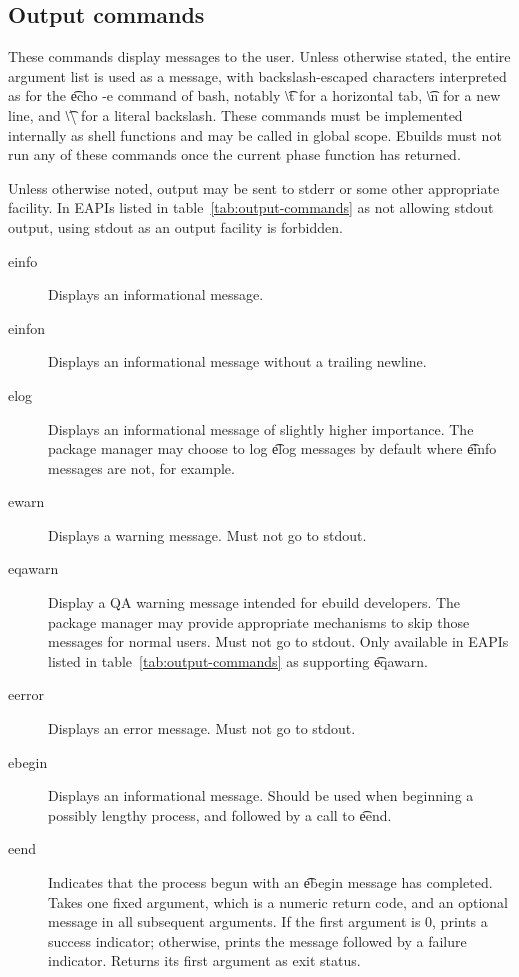 \subsection{Output commands}
These commands display messages to the user. Unless otherwise stated, the entire argument list is
used as a message, with backslash-escaped characters interpreted as for the \t{echo -e} command of
bash, notably \t{\textbackslash t} for a horizontal tab, \t{\textbackslash n} for a new line, and
\t{\textbackslash\textbackslash} for a literal backslash. These commands must be implemented
internally as shell functions and may be called in global scope. Ebuilds must not run any of these
commands once the current phase function has returned.

 Unless otherwise noted, output may be sent to stderr or some other
appropriate facility. In EAPIs listed in table~\ref{tab:output-commands} as not allowing stdout
output, using stdout as an output facility is forbidden.

\begin{description}
\item[einfo] Displays an informational message.
\item[einfon] Displays an informational message without a trailing newline.
\item[elog] Displays an informational message of slightly higher importance. The package
    manager may choose to log \t{elog} messages by default where \t{einfo} messages are not, for
    example.
\item[ewarn] Displays a warning message. Must not go to stdout.
\item[eqawarn]  Display a QA warning message intended for ebuild developers.
    The package manager may provide appropriate mechanisms to skip those messages for normal users.
    Must not go to stdout. Only available in EAPIs listed in table~\ref{tab:output-commands} as
    supporting \t{eqawarn}.
\item[eerror] Displays an error message. Must not go to stdout.
\item[ebegin] Displays an informational message. Should be used when beginning a possibly
    lengthy process, and followed by a call to \t{eend}.
\item[eend] Indicates that the process begun with an \t{ebegin} message has completed. Takes one
    fixed argument, which is a numeric return code, and an optional message in all subsequent
    arguments. If the first argument is 0, prints a success indicator; otherwise, prints the
    message followed by a failure indicator. Returns its first argument as exit status.
\end{description}

